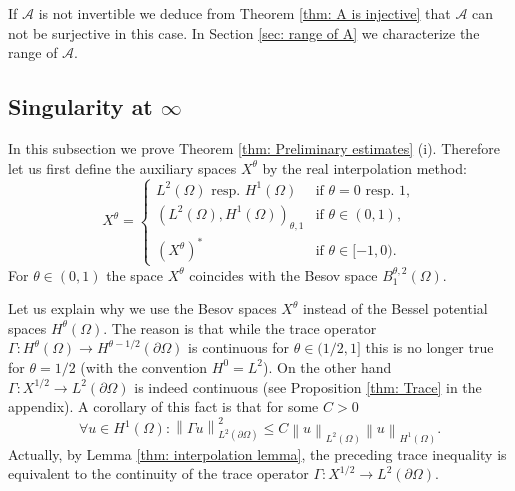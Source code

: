 \documentclass{amsart}
\newcommand{\norm}[1]{\left\| #1 \right\|}
\newcommand{\A}{\mathcal{A}}
\begin{document}
If $\A$ is not invertible we deduce from Theorem \ref{thm: A is injective} that $\A$ can not be surjective in this case. In Section \ref{sec: range of A} we characterize the range of $\A$.

\subsection{Singularity at $\infty$}
In this subsection we prove Theorem \ref{thm: Preliminary estimates} (i). Therefore let us first define the auxiliary spaces $X^{\theta}$ by the real interpolation method:
\begin{equation}\nonumber
 X^{\theta} =
 \begin{cases}
  L^2(\Omega) \text{ resp. } H^1(\Omega) & \text{if } \theta = 0 \text{ resp. } 1, \\
  (L^2(\Omega), H^1(\Omega))_{\theta, 1} & \text{if } \theta\in(0,1), \\
  (X^{\theta})^* & \text{if } \theta\in[-1, 0).
 \end{cases}
\end{equation}
For $\theta\in(0,1)$ the space $X^{\theta}$ coincides with the Besov space $B^{\theta, 2}_1(\Omega)$. 

Let us explain why we use the Besov spaces $X^{\theta}$ instead of the Bessel potential spaces $H^{\theta}(\Omega)$. The reason is that while the trace operator $\Gamma: H^{\theta}(\Omega)\rightarrow H^{\theta-1/2}(\partial\Omega)$ is continuous for $\theta\in(1/2,1]$ this is no longer true for $\theta=1/2$ (with the convention $H^0=L^2$). On the other hand $\Gamma: X^{1/2}\rightarrow L^2(\partial\Omega)$ is indeed continuous (see Proposition \ref{thm: Trace} in the appendix). A corollary of this fact is that for some $C>0$
\begin{equation}\label{eq: Trace inequality}
 \forall u\in H^1(\Omega): \norm{\Gamma u}_{L^2(\partial\Omega)}^2 \leq C \norm{u}_{L^2(\Omega)}\norm{u}_{H^1(\Omega)}.
\end{equation}
Actually, by Lemma \ref{thm: interpolation lemma}, the preceding trace inequality is equivalent to the continuity of the trace operator $\Gamma:X^{1/2}\rightarrow L^2(\partial\Omega)$.
\end{document}
